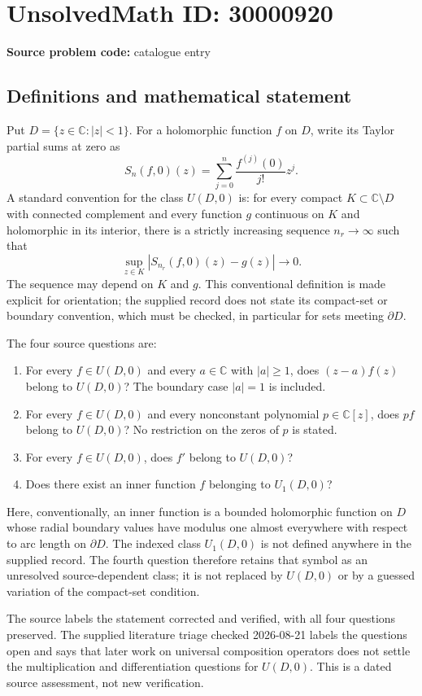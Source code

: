 \documentclass[11pt]{article}
\newcommand{\C}{\mathbb{C}}
\begin{document}
\section*{UnsolvedMath ID: 30000920}
\textbf{Source problem code:} catalogue entry
\subsection{Definitions and mathematical statement}
Put $D=\{z\in\C:|z|<1\}$. For a holomorphic function $f$ on $D$, write its Taylor partial sums at zero as
\[
S_n(f,0)(z)=\sum_{j=0}^{n}\frac{f^{(j)}(0)}{j!}z^j.
\]
A standard convention for the class $U(D,0)$ is: for every compact $K\subset\C\setminus D$ with connected complement and every function $g$ continuous on $K$ and holomorphic in its interior, there is a strictly increasing sequence $n_r\to\infty$ such that
\[
\sup_{z\in K}|S_{n_r}(f,0)(z)-g(z)|\longrightarrow0.
\]
The sequence may depend on $K$ and $g$. This conventional definition is made explicit for orientation; the supplied record does not state its compact-set or boundary convention, which must be checked, in particular for sets meeting $\partial D$.

The four source questions are:
\begin{enumerate}
\item For every $f\in U(D,0)$ and every $a\in\C$ with $|a|\geq1$, does $(z-a)f(z)$ belong to $U(D,0)$? The boundary case $|a|=1$ is included.
\item For every $f\in U(D,0)$ and every nonconstant polynomial $p\in\C[z]$, does $pf$ belong to $U(D,0)$? No restriction on the zeros of $p$ is stated.
\item For every $f\in U(D,0)$, does $f'$ belong to $U(D,0)$?
\item Does there exist an inner function $f$ belonging to $U_1(D,0)$?
\end{enumerate}
Here, conventionally, an inner function is a bounded holomorphic function on $D$ whose radial boundary values have modulus one almost everywhere with respect to arc length on $\partial D$. The indexed class $U_1(D,0)$ is not defined anywhere in the supplied record. The fourth question therefore retains that symbol as an unresolved source-dependent class; it is not replaced by $U(D,0)$ or by a guessed variation of the compact-set condition.

The source labels the statement corrected and verified, with all four questions preserved. The supplied literature triage checked 2026-08-21 labels the questions open and says that later work on universal composition operators does not settle the multiplication and differentiation questions for $U(D,0)$. This is a dated source assessment, not new verification.
\end{document}
